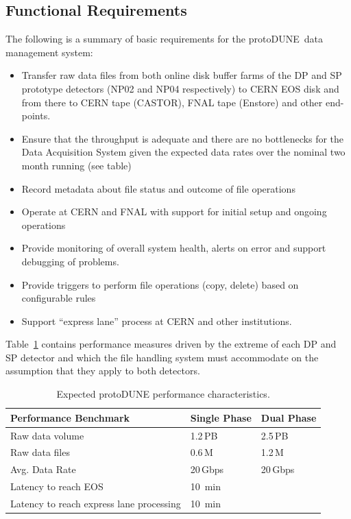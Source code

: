 \documentclass[pdftex,12pt,letter]{article}
\newcommand{\pd}{protoDUNE\ }
\begin{document}
\subsection{Functional Requirements}

The following is a summary of basic requirements for the \pd data management system:
\begin{itemize}
\item Transfer raw data files from both online disk buffer farms of the DP and SP prototype detectors (NP02 and NP04 respectively) to CERN EOS disk and from there to CERN tape (CASTOR), FNAL tape (Enstore) and other end-points.
\item Ensure that the throughput is adequate and there are no bottlenecks for the Data Acquisition System given the expected data rates over the nominal two month running (see table)
\item Record metadata about file status and outcome of file operations
\item Operate at CERN and FNAL with support for initial setup and ongoing operations
\item Provide monitoring of overall system health, alerts on error and support debugging of problems.
\item Provide triggers to perform file operations (copy, delete) based on configurable rules
\item Support “express lane” process at CERN and other institutions.
\end{itemize}

\noindent
Table~\ref{fig:det_perf} contains performance measures driven by the extreme of each DP and SP detector and which the file handling system must accommodate on the assumption that they apply to both detectors.


\begin{table}[tbh]
\centering
\begin{tabular}{l l l}
\hline
\textbf{Performance Benchmark} & \textbf{Single Phase} & \textbf{Dual Phase}\\
\hline
\hline
Raw data volume                          & 1.2\,PB & 2.5\,PB \\
Raw data files                          & 0.6\,M  & 1.2\,M\\
Avg. Data Rate                                & 20\,Gbps & 20\,Gbps \\
Latency to reach EOS                     & 10~min & \\
Latency to reach express lane processing & 10~min &\\
\hline
\end{tabular}
\caption{\label{fig:det_perf}Expected protoDUNE performance characteristics.}
\end{table}
\end{document}
